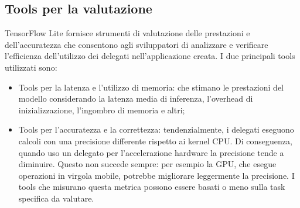 \subsection{Tools per la valutazione}
TensorFlow Lite fornisce strumenti di valutazione delle prestazioni e dell’accuratezza che consentono agli sviluppatori di analizzare e verificare
l’efficienza dell’utilizzo dei delegati nell’applicazione creata. I due principali tools utilizzati sono:
\begin{itemize}
    \item Tools per la latenza e l’utilizzo di memoria: che stimano le prestazioni del modello considerando la latenza media di inferenza,
    l’overhead di inizializzazione, l’ingombro di memoria e altri;
    \item Tools per l’accuratezza e la correttezza: tendenzialmente, i delegati eseguono calcoli con una precisione differente rispetto ai kernel CPU.
    Di conseguenza, quando uso un delegato per l’accelerazione hardware la precisione tende a diminuire. Questo non succede sempre: per esempio la GPU,
    che esegue operazioni in virgola mobile, potrebbe migliorare leggermente la precisione. I tools che misurano questa metrica possono essere basati o
    meno sulla task specifica da valutare.
\end{itemize}

